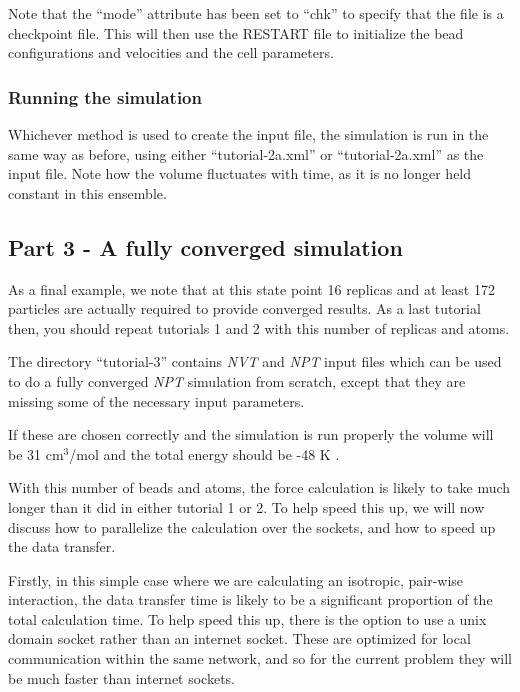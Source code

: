 \documentclass[11pt,english,fleqn]{report}
\begin{document}
Note that the {}``mode'' attribute has been set to {}``chk''
to specify that the file is a checkpoint file.
This will then use the RESTART file to initialize the bead
configurations and velocities and the cell parameters.

\subsubsection{Running the simulation}

Whichever method is used to create the input file, the simulation
is run in the same way as before, using either
{}``tutorial-2a.xml'' or {}``tutorial-2a.xml'' as the input file. 
Note how the volume fluctuates with time, as it is no longer held
constant in this ensemble.

\subsection{Part 3 - A fully converged simulation}

As a final example, we note that at this state point 16 replicas
and at least 172 particles are actually 
required to provide converged results.
As a last tutorial then, you should repeat tutorials 1 and 2 with
this number of replicas and atoms. 

The directory {}``tutorial-3'' contains 
\emph{NVT} and \emph{NPT} input files which can be used to do a fully converged
\emph{NPT} simulation from scratch, except that they are missing some
of the necessary input parameters.

If these are chosen correctly and the simulation is run properly
the volume will be 31 \(\textrm{cm}^3\)/mol and the total energy
should be -48 K \cite{mart+99jcp}.

With this number of beads and atoms, the force calculation is likely
to take much longer than it did in either tutorial 1 or 2.
To help speed this up, we will now discuss how to parallelize the
calculation over the sockets, and how to speed up the data transfer.

Firstly, in this simple case where we are calculating an isotropic,
pair-wise interaction, the data transfer time is likely to be a
significant proportion of the total calculation time. To help speed this
up, there is the option to use a unix domain socket rather than an
internet socket. These are optimized for local communication within
the same network, and so for the current problem they will be much
faster than internet sockets.
\end{document}
